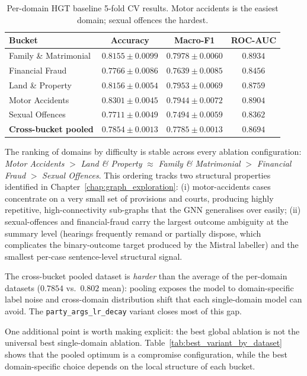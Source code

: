 \begin{table}[H]
  \centering
  \small
  \begin{tabular}{lccc}
    \toprule
    Bucket & Accuracy & Macro-F1 & ROC-AUC \\
    \midrule
    Family \& Matrimonial & $0.8155\pm0.0099$ & $0.7978\pm0.0060$ & $0.8934$ \\
    Financial Fraud      & $0.7766\pm0.0086$ & $0.7639\pm0.0085$ & $0.8456$ \\
    Land \& Property     & $0.8156\pm0.0054$ & $0.7953\pm0.0069$ & $0.8759$ \\
    Motor Accidents      & $0.8301\pm0.0045$ & $0.7944\pm0.0072$ & $0.8904$ \\
    Sexual Offences      & $0.7711\pm0.0049$ & $0.7494\pm0.0059$ & $0.8362$ \\
    \midrule
    \textbf{Cross-bucket pooled} & $0.7854\pm0.0013$ & $0.7785\pm0.0013$ & $0.8694$ \\
    \bottomrule
  \end{tabular}
  \caption{Per-domain HGT baseline 5-fold CV results. Motor accidents
  is the easiest domain; sexual offences the hardest.}
  \label{tab:per_domain}
\end{table}

The ranking of domains by difficulty is stable across every ablation
configuration: \textit{Motor Accidents} $>$ \textit{Land \& Property}
$\approx$ \textit{Family \& Matrimonial} $>$ \textit{Financial Fraud}
$>$ \textit{Sexual Offences}. This ordering tracks two structural
properties identified in
Chapter~\ref{chap:graph_exploration}: (i) motor-accidents cases
concentrate on a very small set of provisions and courts, producing
highly repetitive, high-connectivity sub-graphs that the GNN
generalises over easily; (ii) sexual-offences and financial-fraud
carry the largest outcome ambiguity at the summary level (hearings
frequently remand or partially dispose, which complicates the
binary-outcome target produced by the Mistral labeller) and the
smallest per-case sentence-level structural signal.

The cross-bucket pooled dataset is \emph{harder} than the average of
the per-domain datasets ($0.7854$ vs.\ $0.802$ mean): pooling exposes
the model to domain-specific label noise and cross-domain distribution
shift that each single-domain model can avoid. The
\texttt{party\_args\_lr\_decay} variant closes most of this gap.

{\color{blue}One additional point is worth making explicit: the best
global ablation is not the universal best single-domain ablation.
Table~\ref{tab:best_variant_by_dataset} shows that the pooled optimum
is a compromise configuration, while the best domain-specific choice
depends on the local structure of each bucket.\par}

